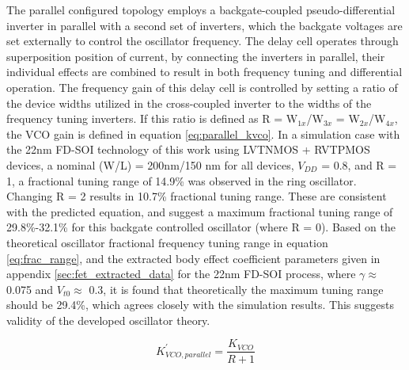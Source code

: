 			The parallel configured topology employs a backgate-coupled pseudo-differential inverter in parallel with a second set of inverters, which the backgate voltages are set externally to control the oscillator frequency. The delay cell operates through superposition position of current, by connecting the inverters in parallel, their individual effects are combined to result in both frequency tuning and differential operation. The frequency gain of this delay cell is controlled by setting a ratio of the device widths utilized in the cross-coupled inverter to the widths of the frequency tuning inverters. If this ratio is defined as R = W$_{1x}$/W$_{3x}$ = W$_{2x}$/W$_{4x}$, the VCO gain is defined in equation \ref{eq:parallel_kvco}. In a simulation case with the 22nm FD-SOI technology of this work using LVTNMOS + RVTPMOS devices, a nominal (W/L) = 200nm/150 nm for all devices, $V_{DD}$ = 0.8, and R = 1, a fractional tuning range of 14.9\% was observed in the ring oscillator. Changing R = 2 results in 10.7\% fractional tuning range. These are consistent with the predicted equation, and suggest a maximum fractional tuning range of 29.8\%-32.1\% for this backgate controlled oscillator (where R = 0). Based on the theoretical oscillator fractional frequency tuning range in equation \ref{eq:frac_range}, and the extracted body effect coefficient parameters given in appendix \ref{sec:fet_extracted_data} for the 22nm FD-SOI process, where $\gamma \approx$ 0.075 and $V_{t0} \approx$ 0.3, it is found that theoretically the maximum tuning range should be 29.4\%, which agrees closely with the simulation results. This suggests validity of the developed oscillator theory.

			\begin{equation}\label{eq:parallel_kvco}
				K_{VCO,parallel}^{'} = \frac{K_{VCO}}{R + 1}
			\end{equation}

